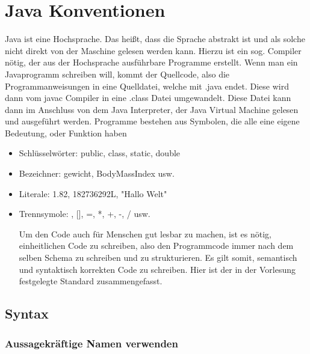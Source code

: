 
\chapter{Java Konventionen}

\ifpdf
    \graphicspath{{Chapter2/Figs/Raster/}{Chapter2/Figs/PDF/}{Chapter2/Figs/}}
\else
    \graphicspath{{Chapter2/Figs/Vector/}{Chapter2/Figs/}}
\fi

Java ist eine Hochsprache. Das heißt, dass die Sprache abstrakt ist und als solche nicht direkt von der Maschine gelesen werden kann. Hierzu ist ein sog. Compiler nötig, der aus der Hochsprache ausführbare Programme erstellt. Wenn man ein Javaprogramm schreiben will, kommt der Quellcode, also die Programmanweisungen in eine Quelldatei, welche mit .java endet. Diese wird dann vom javac Compiler in eine .class Datei umgewandelt. Diese Datei kann dann im Anschluss von dem Java Interpreter, der Java Virtual Machine gelesen und ausgeführt werden.
Programme bestehen aus Symbolen, die alle eine eigene Bedeutung, oder Funktion haben
\begin{itemize}
\item Schlüsselwörter: public, class, static, double
\item Bezeichner: gewicht, BodyMassIndex usw.
\item Literale: 1.82, 182736292L, "Hallo Welt"
\item Trennsymole: {}, [], =, *, +, -, / usw.

Um den Code auch für Menschen gut lesbar zu machen, ist es nötig, einheitlichen Code zu schreiben, also den Programmcode immer nach dem selben Schema zu schreiben und zu strukturieren. Es gilt somit, semantisch und syntaktisch korrekten Code zu schreiben. Hier ist der in der Vorlesung festgelegte Standard zusammengefasst.
\end{itemize}

\section{Syntax}
\subsection{Aussagekräftige Namen verwenden}

